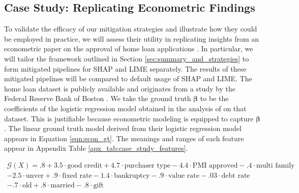 \documentclass[mnsc,blindrev]{informs3}
\begin{document}
\subsection{Case Study: Replicating Econometric Findings}
    \label{sec:case_study}
    To validate the efficacy of our mitigation strategies and illustrate how they could be employed in practice, we will assess their utility in replicating insights from an econometric paper on the approval of home loan applications \citep{bane2006econometric}. In particular, we will tailor the framework outlined in Section \ref{sec:summary_and_strategies} to form mitigated pipelines for SHAP and LIME separately. The results of these mitigated pipelines will be compared to default usage of SHAP and LIME. The home loan dataset is publicly available and originates from a study by the Federal Reserve Bank of Boston \citep{hunter1996cultural}. We take the ground truth $\boldsymbol{\beta}$ to be the coefficients of the logistic regression model obtained in the analysis of \cite{bane2006econometric} on that dataset. This is justifiable because econometric modeling is equipped to capture $\boldsymbol{\beta}$. The linear ground truth model derived from their logistic regression model appears in Equation \ref{eqn:econ_gt}. The meanings and ranges of each feature appear in Appendix Table \ref{apx_tab:case_study_features}.  %

    \begin{equation}
    \label{eqn:econ_gt}
    \begin{split}
        \mathcal{G}(X) =.8 + 3.5\cdot \text{good credit} + 4.7\cdot \text{purchaser type} -4.4 \cdot \text{PMI approved} - .4 \cdot \text{multi family} \\ -2.5 \cdot \text{unver} + .9 \cdot \text{fixed rate} - 1.4 \cdot \text{bankruptcy} - .9 \cdot \text{value rate} - .03 \cdot \text{debt rate} \\- .7 \cdot \text{old} + .8 \cdot \text{married} - .8 \cdot \text{gift}
    \end{split}
    \end{equation}
    
\end{document}
